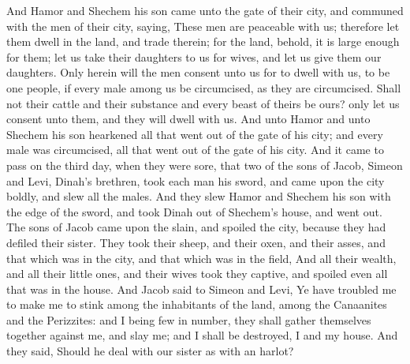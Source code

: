 \begin{biblechapter}
\verse And Hamor and Shechem his son came unto the gate of their city, and communed with the men of their city, saying,
\verse These men are peaceable with us; therefore let them dwell in the land, and trade therein; for the land, behold, it is large enough for them; let us take their daughters to us for wives, and let us give them our daughters.
\verse Only herein will the men consent unto us for to dwell with us, to be one people, if every male among us be circumcised, as they are circumcised.
\verse Shall not their cattle and their substance and every beast of theirs be ours? only let us consent unto them, and they will dwell with us.
\verse And unto Hamor and unto Shechem his son hearkened all that went out of the gate of his city; and every male was circumcised, all that went out of the gate of his city.
\verse And it came to pass on the third day, when they were sore, that two of the sons of Jacob, Simeon and Levi, Dinah's brethren, took each man his sword, and came upon the city boldly, and slew all the males.
\verse And they slew Hamor and Shechem his son with the edge of the sword, and took Dinah out of Shechem's house, and went out.
\verse The sons of Jacob came upon the slain, and spoiled the city, because they had defiled their sister.
\verse They took their sheep, and their oxen, and their asses, and that which was in the city, and that which was in the field,
\verse And all their wealth, and all their little ones, and their wives took they captive, and spoiled even all that was in the house.
\verse And Jacob said to Simeon and Levi, Ye have troubled me to make me to stink among the inhabitants of the land, among the Canaanites and the Perizzites: and I being few in number, they shall gather themselves together against me, and slay me; and I shall be destroyed, I and my house.
\verse And they said, Should he deal with our sister as with an harlot?
\end{biblechapter}

